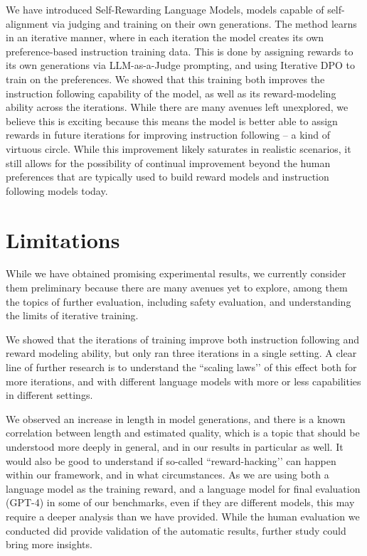\documentclass{article}
\begin{document}
We have introduced Self-Rewarding Language Models, models capable of self-alignment via judging and  training on their own generations. The method learns in an iterative manner, where in each iteration the model creates its  own preference-based instruction training data. This is done by assigning rewards to its own generations via LLM-as-a-Judge prompting, and using Iterative DPO to train on the preferences. We showed that  this training both improves the instruction following capability of the model, as well as its reward-modeling ability across the iterations. While there are many avenues left unexplored, we believe this is exciting  because 
this means  the model is better able to assign rewards in future iterations for improving instruction following -- a kind of virtuous circle. 
While this improvement likely saturates in realistic scenarios,
it still allows for the possibility of continual improvement beyond the human preferences that are typically used to build reward models and instruction following models today.






\section{Limitations}

While we have obtained  promising experimental results, we currently consider them preliminary because there are many avenues yet to explore, among them the topics of further evaluation, including safety evaluation, and understanding the limits of iterative training. 

We showed that the iterations of training improve both instruction following and reward modeling ability, but only ran three iterations in a single setting. A clear line of further research is to understand the ``scaling laws’’ of this effect both for more iterations, and with different language models with more or less capabilities in different settings.

We observed an increase in length in model generations, and there is a known correlation between length and estimated quality, which is a topic that should be understood more deeply in general, and in our results in particular as well. It would also be good to understand if so-called ``reward-hacking’’ can happen within our framework, and in what circumstances. As we are using both a language model as the training reward, and a language model for final evaluation (GPT-4) in some of our benchmarks, even if they are different models, this may require a deeper analysis than we have provided. While the human evaluation we conducted did provide validation of the automatic results, further study could bring more insights.
\end{document}
